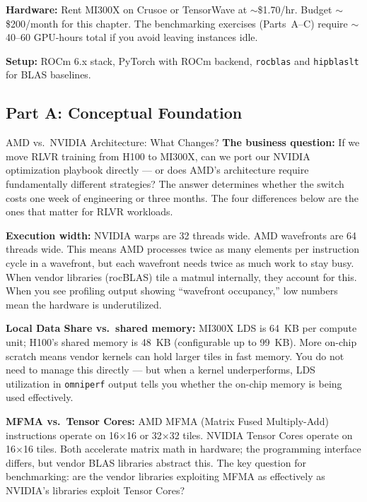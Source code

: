 \textbf{Hardware:} Rent MI300X on Crusoe or TensorWave at $\sim$\$1.70/hr. Budget $\sim$\$200/month for this chapter. The benchmarking exercises (Parts~A--C) require $\sim$40--60 GPU-hours total if you avoid leaving instances idle.

\textbf{Setup:} ROCm 6.x stack, PyTorch with ROCm backend, \texttt{rocblas} and \texttt{hipblaslt} for BLAS baselines.

\subsection{Part A: Conceptual Foundation}

\begin{thinkfirst}{AMD vs.\ NVIDIA Architecture: What Changes?}
\textbf{The business question:} If we move RLVR training from H100 to MI300X, can we port our NVIDIA optimization playbook directly --- or does AMD's architecture require fundamentally different strategies? The answer determines whether the switch costs one week of engineering or three months. The four differences below are the ones that matter for RLVR workloads.

\textbf{Execution width:} NVIDIA warps are 32 threads wide. AMD wavefronts are 64 threads wide. This means AMD processes twice as many elements per instruction cycle in a wavefront, but each wavefront needs twice as much work to stay busy. When vendor libraries (rocBLAS) tile a matmul internally, they account for this. When you see profiling output showing ``wavefront occupancy,'' low numbers mean the hardware is underutilized.

\textbf{Local Data Share vs.\ shared memory:} MI300X LDS is 64~KB per compute unit; H100's shared memory is 48~KB (configurable up to 99~KB). More on-chip scratch means vendor kernels can hold larger tiles in fast memory. You do not need to manage this directly --- but when a kernel underperforms, LDS utilization in \texttt{omniperf} output tells you whether the on-chip memory is being used effectively.

\textbf{MFMA vs.\ Tensor Cores:} AMD MFMA (Matrix Fused Multiply-Add) instructions operate on 16$\times$16 or 32$\times$32 tiles. NVIDIA Tensor Cores operate on 16$\times$16 tiles. Both accelerate matrix math in hardware; the programming interface differs, but vendor BLAS libraries abstract this. The key question for benchmarking: are the vendor libraries exploiting MFMA as effectively as NVIDIA's libraries exploit Tensor Cores?


\end{thinkfirst}
